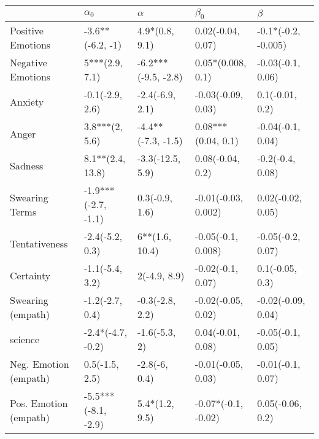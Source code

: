 \begin{tabular}{lllll}
\toprule
{} &           $\alpha_0$ &             $\alpha$ &            $\beta_0$ &              $\beta$ \\
\midrule
Positive Emotions     &     -3.6**(-6.2, -1) &       4.9*(0.8, 9.1) &    0.02(-0.04, 0.07) &  -0.1*(-0.2, -0.005) \\
Negative Emotions     &       5***(2.9, 7.1) &  -6.2***(-9.5, -2.8) &    0.05*(0.008, 0.1) &    -0.03(-0.1, 0.06) \\
Anxiety               &      -0.1(-2.9, 2.6) &      -2.4(-6.9, 2.1) &   -0.03(-0.09, 0.03) &      0.1(-0.01, 0.2) \\
Anger                 &       3.8***(2, 5.6) &   -4.4**(-7.3, -1.5) &   0.08***(0.04, 0.1) &    -0.04(-0.1, 0.04) \\
Sadness               &     8.1**(2.4, 13.8) &     -3.3(-12.5, 5.9) &     0.08(-0.04, 0.2) &     -0.2(-0.4, 0.08) \\
Swearing Terms        &  -1.9***(-2.7, -1.1) &       0.3(-0.9, 1.6) &  -0.01(-0.03, 0.002) &    0.02(-0.02, 0.05) \\
Tentativeness         &      -2.4(-5.2, 0.3) &       6**(1.6, 10.4) &   -0.05(-0.1, 0.008) &    -0.05(-0.2, 0.07) \\
Certainty             &      -1.1(-5.4, 3.2) &         2(-4.9, 8.9) &    -0.02(-0.1, 0.07) &      0.1(-0.05, 0.3) \\
Swearing (empath)     &      -1.2(-2.7, 0.4) &      -0.3(-2.8, 2.2) &   -0.02(-0.05, 0.02) &   -0.02(-0.09, 0.04) \\
science               &    -2.4*(-4.7, -0.2) &        -1.6(-5.3, 2) &    0.04(-0.01, 0.08) &    -0.05(-0.1, 0.05) \\
Neg. Emotion (empath) &       0.5(-1.5, 2.5) &        -2.8(-6, 0.4) &   -0.01(-0.05, 0.03) &    -0.01(-0.1, 0.07) \\
Pos. Emotion (empath) &  -5.5***(-8.1, -2.9) &       5.4*(1.2, 9.5) &  -0.07*(-0.1, -0.02) &     0.05(-0.06, 0.2) \\
\bottomrule
\end{tabular}
